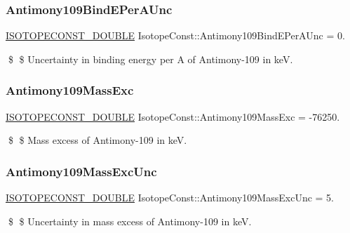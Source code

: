 \subsubsection{\texorpdfstring{Antimony109\+Bind\+E\+Per\+A\+Unc}{Antimony109BindEPerAUnc}}
{\footnotesize\ttfamily \mbox{\hyperlink{group___isotope_const-_macros_ga8f45a7272ce02c0b4c65c44636ed719a}{I\+S\+O\+T\+O\+P\+E\+C\+O\+N\+S\+T\+\_\+\+D\+O\+U\+B\+LE}} Isotope\+Const\+::\+Antimony109\+Bind\+E\+Per\+A\+Unc = 0.}

\$ \$ Uncertainty in binding energy per A of Antimony-\/109 in keV. \mbox{\label{group___isotope_const-_antimony-_sb109_ga3830449be9d02b366e9afd560ee34f5a}} 
\subsubsection{\texorpdfstring{Antimony109\+Mass\+Exc}{Antimony109MassExc}}
{\footnotesize\ttfamily \mbox{\hyperlink{group___isotope_const-_macros_ga8f45a7272ce02c0b4c65c44636ed719a}{I\+S\+O\+T\+O\+P\+E\+C\+O\+N\+S\+T\+\_\+\+D\+O\+U\+B\+LE}} Isotope\+Const\+::\+Antimony109\+Mass\+Exc = -\/76250.}

\$ \$ Mass excess of Antimony-\/109 in keV. \mbox{\label{group___isotope_const-_antimony-_sb109_gaecfeaf011d7c81f30a5f9389cc5b19b9}} 
\subsubsection{\texorpdfstring{Antimony109\+Mass\+Exc\+Unc}{Antimony109MassExcUnc}}
{\footnotesize\ttfamily \mbox{\hyperlink{group___isotope_const-_macros_ga8f45a7272ce02c0b4c65c44636ed719a}{I\+S\+O\+T\+O\+P\+E\+C\+O\+N\+S\+T\+\_\+\+D\+O\+U\+B\+LE}} Isotope\+Const\+::\+Antimony109\+Mass\+Exc\+Unc = 5.}

\$ \$ Uncertainty in mass excess of Antimony-\/109 in keV. \mbox{\label{group___isotope_const-_antimony-_sb109_ga6161f133facb824ea10629b74d246851}} 
